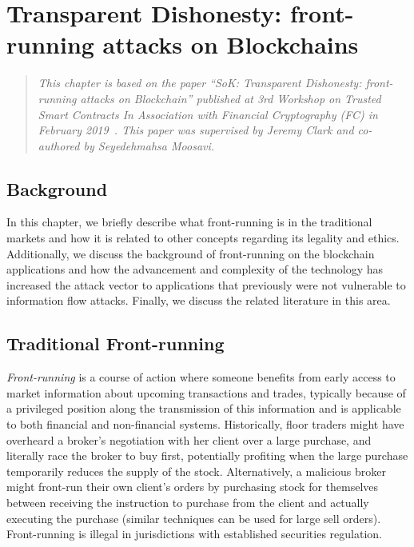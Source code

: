 

\chapter{Transparent Dishonesty: front-running attacks on Blockchains}




\begin{quote}
	\textit{This chapter is based on the paper ``SoK: Transparent Dishonesty: front-running attacks on Blockchain'' published at 3rd Workshop on Trusted Smart Contracts In Association with Financial Cryptography (FC) in February 2019~\cite{eskandari2019sok}. This paper was supervised by Jeremy Clark and co-authored by Seyedehmahsa Moosavi.}
\end{quote}


\section{Background}

In this chapter, we briefly describe what front-running is in the traditional markets and how it is related to other concepts regarding its legality and ethics. Additionally, we discuss the background of front-running on the blockchain applications and how the advancement and complexity of the technology has increased the attack vector to applications that previously were not vulnerable to information flow attacks. Finally, we discuss the related literature in this area. 



\section{Traditional Front-running}
\label{sec:What is front-running?}

\emph{Front-running} is a course of action where someone benefits from early access to market information about upcoming transactions and trades, typically because of a privileged position along the transmission of this information and is applicable to both financial and non-financial systems. Historically, floor traders might have overheard a broker's negotiation with her client over a large purchase, and literally race the broker to buy first, potentially profiting when the large purchase temporarily reduces the supply of the stock. Alternatively, a malicious broker might front-run their own client's orders by purchasing stock for themselves between receiving the instruction to purchase from the client and actually executing the purchase (similar techniques can be used for large sell orders). Front-running is illegal in jurisdictions with established securities regulation.

